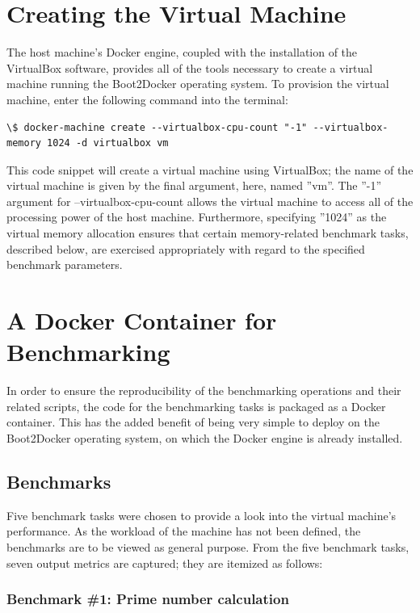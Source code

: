 \documentclass[sigconf]{acmart}
\begin{document}
\section{Creating the Virtual Machine}

The host machine's Docker engine, coupled with the installation of the VirtualBox software, provides all of the tools necessary to create a virtual machine running the Boot2Docker operating system. To provision the virtual machine, enter the following command into the terminal:

\begin{lstlisting}
\$ docker-machine create --virtualbox-cpu-count "-1" --virtualbox-memory 1024 -d virtualbox vm
\end{lstlisting}



This code snippet will create a virtual machine using VirtualBox; the name of the virtual machine is given by the final argument, here, named ''vm''. The ''-1'' argument for --virtualbox-cpu-count allows the virtual machine to access all of the processing power of the host machine. Furthermore, specifying ''1024'' as the virtual memory allocation ensures that certain memory-related benchmark tasks, described below, are exercised appropriately with regard to the specified benchmark parameters.

\section{A Docker Container for Benchmarking}

In order to ensure the reproducibility of the benchmarking operations and their related scripts, the code for the benchmarking tasks is packaged as a Docker container. This has the added benefit of being very simple to deploy on the Boot2Docker operating system, on which the Docker engine is already installed.

\subsection{Benchmarks}

Five benchmark tasks were chosen to provide a look into the virtual machine's performance. As the workload of the machine has not been defined, the benchmarks are to be viewed as general purpose. From the five benchmark tasks, seven output metrics are captured; they are itemized as follows:

\subsubsection{Benchmark \#1: Prime number calculation}
\end{document}
